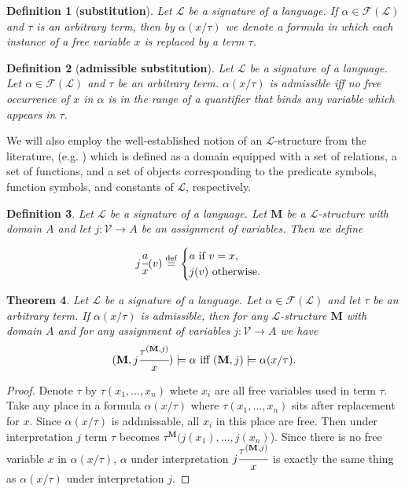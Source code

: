 \documentclass[10pt]{article}
\theoremstyle{plain}
\newtheorem{theorem}{Theorem}[section]
\newtheorem{definition}[theorem]{Definition}
\newcommand{\defeq}{\stackrel{\mathrm{def}}{=}}
\newcommand{\F}{\mathcal{F}}
\renewcommand{\L}{\mathscr{L}}
\newcommand{\V}{\mathscr{V}}
\newcommand{\M}{\mathbf{M}}
\begin{document}
\begin{definition}[\textbf{substitution}]
Let $\L$ be a signature of a language.
If $\alpha\in\F(\L)$ and $\tau$ is an arbitrary term, then 
by $\alpha(x/\tau)$ we denote a formula in which each instance of a free variable $x$ is replaced by a term $\tau$.
\end{definition}

\begin{definition}[\textbf{admissible substitution}]
\label{admissible}
Let $\L$ be a signature of a language.
Let $\alpha\in\F(\L)$ and $\tau$ be an arbitrary term.
$\alpha(x/\tau)$ is admissible iff no free
occurrence of $x$ in $\alpha$ is in the range of a quantifier that binds any variable which
appears in $\tau$.
\end{definition}

We will also employ the well-established notion of an $\L$-structure from the literature, (e.g. \cite{prestel2011}) which is defined as a domain equipped with a set of relations, a set of functions, and a set of objects corresponding to the predicate symbols, function symbols, and constants of $\L$, respectively.

\begin{definition}
Let $\L$ be a signature of a language.
Let $\M$ be a $\L$-structure with domain $A$ and let $j:\V\to A$ be an assignment of variables. Then we define  
\end{definition}

\begin{equation}
j\cfrac{a}{x}(v) \defeq
\begin{cases}
a \text{ if } v = x,\\
j(v) \text{ otherwise}.
\end{cases}
\end{equation}

\begin{theorem}
\label{admissible-theorem}
Let $\L$ be a signature of a language. Let $\alpha\in\F(\L)$ and let $\tau$ be an arbitrary term. If $\alpha(x/\tau)$ is admissible, then for any $\L$-structure $\M$ with domain $A$ and for any assignment of variables $j:\V\to A$ we have
\begin{equation}
(\M, j\cfrac{\tau^{(\M, j)}}{x})\models \alpha \text{ iff } (\M, j)\models \alpha(x/\tau).
\end{equation} 
\end{theorem}
\begin{proof}
Denote $\tau$ by $\tau(x_1, \dots, x_n)$ whete $x_i$ are all free variables used in term $\tau$. Take any place in a formula $\alpha(x/\tau)$ where $\tau(x_1, \dots, x_n)$ sits after replacement for $x$. Since $\alpha(x/\tau)$ is addmissable, all $x_i$ in this place are free. Then under interpretation $j$ term $\tau$ becomes $\tau^\M(j(x_1),\dots, j(x_n)$). Since there is no free variable $x$ in $\alpha(x/\tau)$, $\alpha$ under interpretation $j\cfrac{\tau^{(\M, j)}}{x}$ is exactly the same thing as $\alpha(x/\tau)$ under interpretation $j$.   
\end{proof}
\end{document}
